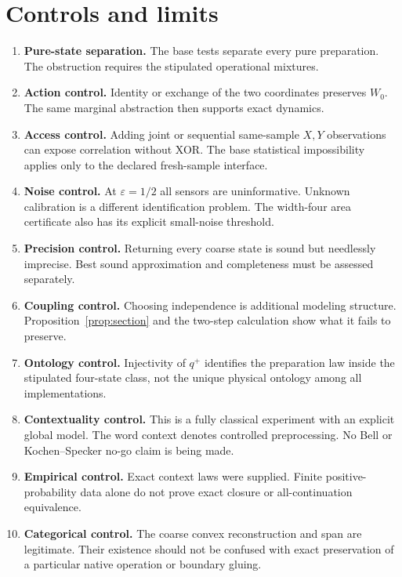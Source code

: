 \documentclass[11pt]{article}
\theoremstyle{definition}
\newcommand{\eps}{\varepsilon}
\begin{document}
\section{Controls and limits}
\begin{enumerate}
 \item \textbf{Pure-state separation.} The base tests separate every pure preparation. The obstruction requires the stipulated operational mixtures.
 \item \textbf{Action control.} Identity or exchange of the two coordinates preserves $W_0$. The same marginal abstraction then supports exact dynamics.
 \item \textbf{Access control.} Adding joint or sequential same-sample $X,Y$ observations can expose correlation without XOR. The base statistical impossibility applies only to the declared fresh-sample interface.
 \item \textbf{Noise control.} At $\eps=1/2$ all sensors are uninformative. Unknown calibration is a different identification problem. The width-four area certificate also has its explicit small-noise threshold.
 \item \textbf{Precision control.} Returning every coarse state is sound but needlessly imprecise. Best sound approximation and completeness must be assessed separately.
 \item \textbf{Coupling control.} Choosing independence is additional modeling structure. Proposition~\ref{prop:section} and the two-step calculation show what it fails to preserve.
 \item \textbf{Ontology control.} Injectivity of $q^+$ identifies the preparation law inside the stipulated four-state class, not the unique physical ontology among all implementations.
 \item \textbf{Contextuality control.} This is a fully classical experiment with an explicit global model. The word context denotes controlled preprocessing. No Bell or Kochen--Specker no-go claim is being made.
 \item \textbf{Empirical control.} Exact context laws were supplied. Finite positive-probability data alone do not prove exact closure or all-continuation equivalence.
 \item \textbf{Categorical control.} The coarse convex reconstruction and span are legitimate. Their existence should not be confused with exact preservation of a particular native operation or boundary gluing.
\end{enumerate}
\end{document}
